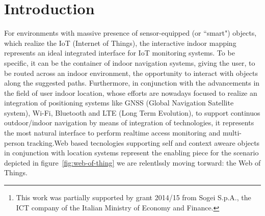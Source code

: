 \documentclass{sig-alternate}
\begin{document}
\date{23 March 2015}
\maketitle


\begin{abstract} This paper introduces HIJSON\footnote{This work was partially
supported by grant 2014/15 from Sogei S.p.A., the ICT company of the Italian
Ministry of Economy and Finance.}, a novel indoor cartographic document
format. A software framework is also presented, that relies on HIJSON
documents and is entirely based on web technologies. With respect to current
cartographic formats, HIJSON suggests four major enhancements: (a) exposes a
hierarchical structure; (b) uses local metric coordinate systems; (c) may
import external geometric models; (d) accepts semantic extensions. The
semantic extensions supported by the HIJSON framework architecture encapsulate
the details about communication protocols, rendering style, and exchanged and
displayed information, allowing the HIJSON format to be extended with any sort
of models of objects, sensors or behaviors. \end{abstract}


\section{Introduction}

For environments with massive presence of sensor-equipped (or ``smart")
objects, which realize the IoT (Internet of Things), the interactive indoor
mapping represents an ideal integrated interface for IoT monitoring systems.
To be specific, it can be the container of indoor navigation systems, giving
the user, to be routed across an indoor environment, the opportunity to
interact with objects along the suggested paths. Furthermore, in conjunction
with the advancements in the field of user indoor location, whose efforts are
nowadays focused to realize an integration of positioning systems like GNSS
(Global Navigation Satellite system), Wi-Fi, Bluetooth and LTE (Long Term
Evolution), to support continuos outdoor/indoor navigation by means of
integration of technologies, it represents the most natural interface to
perform realtime access monitoring and multi-person tracking.Web based
tecnologies supporting self and context aweare objects in conjunction  with
location systems represent the enabling piece for the scenario depicted in
figure~\ref{fig:web-of-thing} we are relentlssly moving torward: the Web of
Things.
\end{document}
